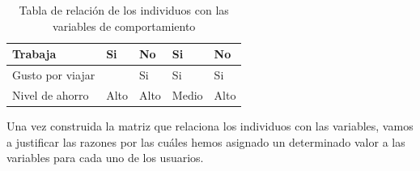 \begin{table}[H]
\begin{tabular}{p{10em}|p{7em}|p{7em}|p{7em}|p{8em}|}
        Trabaja                           & Si          & No                             & Si                 & No                              \\ \hline
        Gusto por viajar                  &             & Si                             & Si                 & Si                              \\ \hline
        Nivel de ahorro                   & Alto        & Alto                           & Medio              & Alto                            \\ \hline
    \end{tabular}
    \caption{Tabla de relación de los individuos con las variables de comportamiento}
    \label{table:relacion-individuos-variables}
\end{table}

Una vez construida la matriz que relaciona los individuos con las variables, vamos a justificar las razones por las cuáles hemos asignado un
determinado valor a las variables para cada uno de los usuarios. \\

